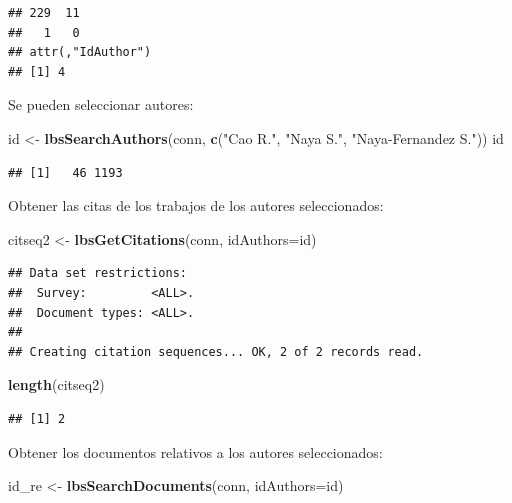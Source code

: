 \documentclass[]{book}
\newenvironment{Shaded}{\begin{snugshade}}{\end{snugshade}}
\newcommand{\KeywordTok}[1]{\textcolor[rgb]{0.13,0.29,0.53}{\textbf{#1}}}
\newcommand{\DataTypeTok}[1]{\textcolor[rgb]{0.13,0.29,0.53}{#1}}
\newcommand{\StringTok}[1]{\textcolor[rgb]{0.31,0.60,0.02}{#1}}
\newcommand{\NormalTok}[1]{#1}
\begin{document}
\begin{verbatim}
## 229  11 
##   1   0 
## attr(,"IdAuthor")
## [1] 4
\end{verbatim}

Se pueden seleccionar autores:

\begin{Shaded}
\begin{Highlighting}[]
\NormalTok{id <-}\StringTok{ }\KeywordTok{lbsSearchAuthors}\NormalTok{(conn, }\KeywordTok{c}\NormalTok{(}\StringTok{"Cao R."}\NormalTok{, }\StringTok{"Naya S."}\NormalTok{, }\StringTok{"Naya-Fernandez S."}\NormalTok{))}
\NormalTok{id}
\end{Highlighting}
\end{Shaded}

\begin{verbatim}
## [1]   46 1193
\end{verbatim}

Obtener las citas de los trabajos de los autores seleccionados:

\begin{Shaded}
\begin{Highlighting}[]
\NormalTok{citseq2 <-}\StringTok{ }\KeywordTok{lbsGetCitations}\NormalTok{(conn, }\DataTypeTok{idAuthors=}\NormalTok{id)}
\end{Highlighting}
\end{Shaded}

\begin{verbatim}
## Data set restrictions:
##  Survey:         <ALL>.
##  Document types: <ALL>.
## 
## Creating citation sequences... OK, 2 of 2 records read.
\end{verbatim}

\begin{Shaded}
\begin{Highlighting}[]
\KeywordTok{length}\NormalTok{(citseq2)}
\end{Highlighting}
\end{Shaded}

\begin{verbatim}
## [1] 2
\end{verbatim}

Obtener los documentos relativos a los autores seleccionados:

\begin{Shaded}
\begin{Highlighting}[]
\NormalTok{id_re  <-}\StringTok{  }\KeywordTok{lbsSearchDocuments}\NormalTok{(conn, }\DataTypeTok{idAuthors=}\NormalTok{id)}
\end{Highlighting}
\end{Shaded}
\end{document}
